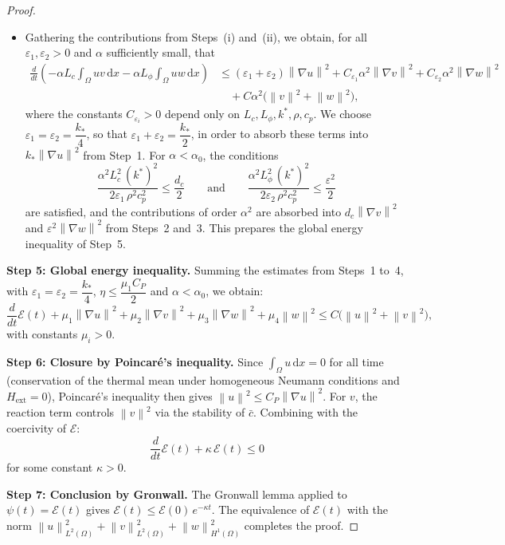\documentclass[final,1p,times]{elsarticle}
\newcommand{\dx}{\,\mathrm{d}x}
\numberwithin{equation}{section}
\newcommand{\norm}[1]{\left\|#1\right\|}
\begin{document}
\begin{proof}
\begin{itemize}
			\item[\textbf{(iii)}]
			Gathering the contributions from Steps~(i) and~(ii), we obtain,
			for all $\varepsilon_1, \varepsilon_2 > 0$ and $\alpha$ sufficiently small, that
			\begin{align*}
				\frac{d}{dt}\!\left(
				-\alpha L_c\int_\Omega uv\dx
				-\alpha L_\phi\int_\Omega uw\dx
				\right)
				&\leq
				(\varepsilon_1+\varepsilon_2)\norm{\nabla u}^2
				+ C_{\varepsilon_1}\alpha^2\norm{\nabla v}^2
				+ C_{\varepsilon_2}\alpha^2\norm{\nabla w}^2 \\
				&\quad + C\alpha^2\bigl(\norm{v}^2 + \norm{w}^2\bigr),
			\end{align*}
			where the constants $C_{\varepsilon_i} > 0$ depend only on
			$L_c, L_\phi, k^*, \rho, c_p$.
			We choose $\varepsilon_1 = \varepsilon_2 = \dfrac{k_*}{4}$, so that
			$\varepsilon_1 + \varepsilon_2 = \dfrac{k_*}{2}$, in order to absorb these terms
			into $k_*\norm{\nabla u}^2$ from Step~1. For $\alpha < \alpha_0$, the conditions
			\[
			\frac{\alpha^2 L_c^2\,(k^*)^2}{2\varepsilon_1\,\rho^2 c_p^2} \leq \frac{d_c}{2}
			\qquad\text{and}\qquad
			\frac{\alpha^2 L_\phi^2\,(k^*)^2}{2\varepsilon_2\,\rho^2 c_p^2} \leq \frac{\varepsilon^2}{2}
			\]
			are satisfied, and the contributions of order $\alpha^2$ are absorbed into
			$d_c\norm{\nabla v}^2$ and $\varepsilon^2\norm{\nabla w}^2$ from Steps~2 and~3. This prepares the global energy inequality of Step~5.
		\end{itemize}
		\textbf{Step 5: Global energy inequality.}
		Summing the estimates from Steps~1 to~4, with $\varepsilon_1 = \varepsilon_2 = \dfrac{k_*}{4}$,
		$\eta \leq \dfrac{\mu_1 C_P}{2}$ and $\alpha < \alpha_0$, we obtain:
		\[
		\frac{d}{dt}\mathcal{E}(t)
		+ \mu_1\norm{\nabla u}^2 + \mu_2\norm{\nabla v}^2 + \mu_3\norm{\nabla w}^2 + \mu_4\norm{w}^2
		\leq C\bigl(\norm{u}^2 + \norm{v}^2\bigr),
		\]
		with constants $\mu_i > 0$.
		
		\medskip
		\textbf{Step 6: Closure by Poincaré's inequality.}
		Since $\int_\Omega u\dx = 0$ for all time (conservation of the thermal mean under homogeneous Neumann conditions and $H_{\mathrm{ext}} = 0$), Poincaré's inequality
		then gives $\norm{u}^2 \leq C_P\norm{\nabla u}^2$. For $v$, the reaction term controls
		$\norm{v}^2$ via the stability of $\bar c$. Combining with the coercivity of $\mathcal{E}$:
		\[
		\frac{d}{dt}\mathcal{E}(t) + \kappa\,\mathcal{E}(t) \leq 0
		\]
		for some constant $\kappa > 0$.
		
		\medskip
		\textbf{Step 7: Conclusion by Gronwall.}
		The Gronwall lemma applied to $\psi(t) = \mathcal{E}(t)$ gives
		$\mathcal{E}(t) \leq \mathcal{E}(0)\,e^{-\kappa t}$.
		The equivalence of $\mathcal{E}(t)$ with the norm $\norm{u}_{L^2(\Omega)}^2 + \norm{v}_{L^2(\Omega)}^2 + \norm{w}_{H^1(\Omega)}^2$ completes the proof.
	\end{proof}
	
\end{document}
